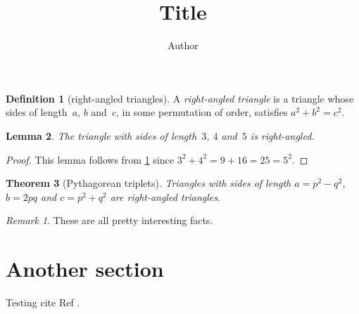 \newtheorem{theorem}{Theorem}
\newtheorem{corollary}[theorem]{Corollary}
\newtheorem{lemma}[theorem]{Lemma}
\theoremstyle{definition}
\newtheorem{definition}[theorem]{Definition}
\theoremstyle{remark}
\newtheorem{remark}{Remark}

\title{Title}
\author{Author}

\begin{definition}[right-angled triangles] \label{def:tri}
A \emph{right-angled triangle} is a triangle whose sides of length~\(a\), \(b\) and~\(c\), in some permutation of order, satisfies \(a^2+b^2=c^2\).
\end{definition}

\begin{lemma}
The triangle with sides of length~\(3\), \(4\) and~\(5\) is right-angled.
\end{lemma}

\begin{proof}
This lemma follows from \cref{def:tri} since \(3^2+4^2=9+16=25=5^2\).
\end{proof}

\begin{theorem}[Pythagorean triplets] \label{thm:py}
Triangles with sides of length \(a=p^2-q^2\), \(b=2pq\) and \(c=p^2+q^2\) are right-angled triangles.
\end{theorem}

\begin{remark}
These are all pretty interesting facts.
\end{remark}

\section{Another section}
Testing cite Ref \cite{temp}.

